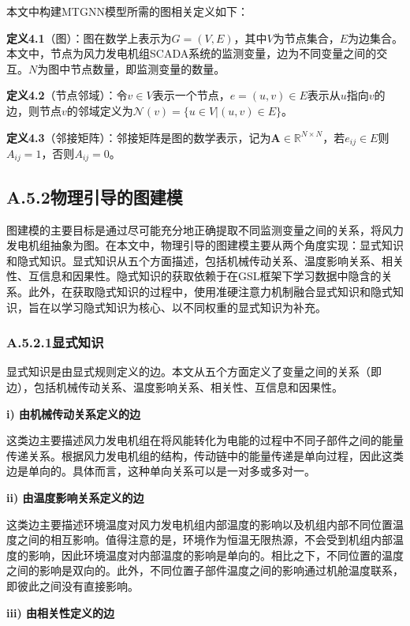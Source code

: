 本文中构建MTGNN模型所需的图相关定义如下：

\textbf{定义4.1}（图）：图在数学上表示为$G = (V, E)$，其中$V$为节点集合，$E$为边集合。本文中，节点为风力发电机组SCADA系统的监测变量，边为不同变量之间的交互。$N$为图中节点数量，即监测变量的数量。

\textbf{定义4.2}（节点邻域）：令$v \in V$表示一个节点，$e = (u, v) \in E$表示从$u$指向$v$的边，则节点$v$的邻域定义为$\mathcal{N}(v) = \{u \in V | (u, v) \in E\}$。

\textbf{定义4.3}（邻接矩阵）：邻接矩阵是图的数学表示，记为$\boldsymbol{A} \in \mathbb{R}^{N \times N}$，若$e_{ij} \in E$则$A_{ij} = 1$，否则$A_{ij} = 0$。

\subsection*{A.5.2\quad 物理引导的图建模}

图建模的主要目标是通过尽可能充分地正确提取不同监测变量之间的关系，将风力发电机组抽象为图。在本文中，物理引导的图建模主要从两个角度实现：显式知识和隐式知识。显式知识从五个方面描述，包括机械传动关系、温度影响关系、相关性、互信息和因果性。隐式知识的获取依赖于在GSL框架下学习数据中隐含的关系。此外，在获取隐式知识的过程中，使用准硬注意力机制融合显式知识和隐式知识，旨在以学习隐式知识为核心、以不同权重的显式知识为补充。

\subsubsection*{A.5.2.1\quad 显式知识}

显式知识是由显式规则定义的边。本文从五个方面定义了变量之间的关系（即边），包括机械传动关系、温度影响关系、相关性、互信息和因果性。

\textbf{i) 由机械传动关系定义的边}

这类边主要描述风力发电机组在将风能转化为电能的过程中不同子部件之间的能量传递关系。根据风力发电机组的结构，传动链中的能量传递是单向过程，因此这类边是单向的。具体而言，这种单向关系可以是一对多或多对一。

\textbf{ii) 由温度影响关系定义的边}

这类边主要描述环境温度对风力发电机组内部温度的影响以及机组内部不同位置温度之间的相互影响。值得注意的是，环境作为恒温无限热源，不会受到机组内部温度的影响，因此环境温度对内部温度的影响是单向的。相比之下，不同位置的温度之间的影响是双向的。此外，不同位置子部件温度之间的影响通过机舱温度联系，即彼此之间没有直接影响。

\textbf{iii) 由相关性定义的边}

